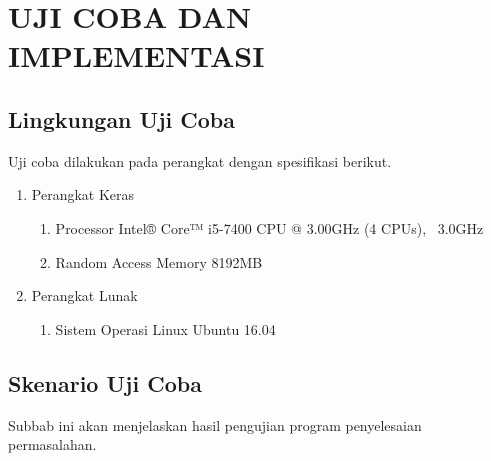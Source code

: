 \chapter{UJI COBA DAN IMPLEMENTASI}

\section{Lingkungan Uji Coba}

Uji coba dilakukan pada perangkat dengan spesifikasi berikut.
\begin{enumerate}
  \item Perangkat Keras
  \begin{enumerate}
    \item Processor Intel® Core™ i5-7400 CPU @ 3.00GHz (4 CPUs), ~3.0GHz
    \item Random Access Memory 8192MB
  \end{enumerate}
  \item Perangkat Lunak
  \begin{enumerate}
    \item Sistem Operasi Linux Ubuntu 16.04
  \end{enumerate}
\end{enumerate}

\section{Skenario Uji Coba}

Subbab ini akan menjelaskan hasil pengujian program penyelesaian permasalahan.